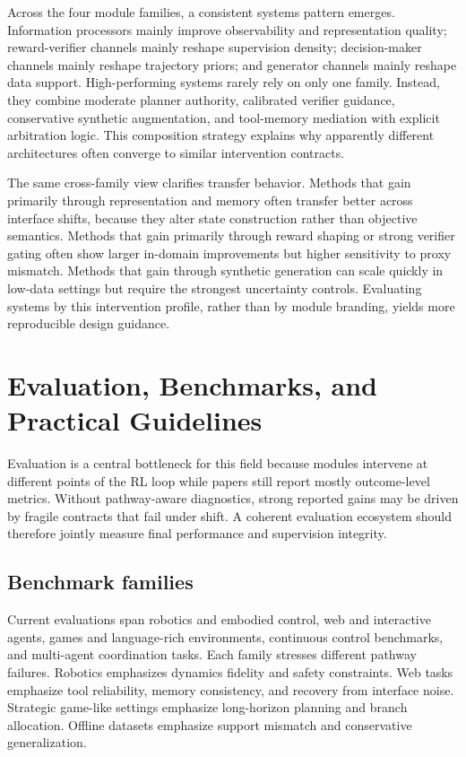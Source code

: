 ﻿\documentclass[conference]{IEEEtran}
\begin{document}
Across the four module families, a consistent systems pattern emerges. Information processors mainly improve observability and representation quality; reward-verifier channels mainly reshape supervision density; decision-maker channels mainly reshape trajectory priors; and generator channels mainly reshape data support. High-performing systems rarely rely on only one family. Instead, they combine moderate planner authority, calibrated verifier guidance, conservative synthetic augmentation, and tool-memory mediation with explicit arbitration logic. This composition strategy explains why apparently different architectures often converge to similar intervention contracts.

The same cross-family view clarifies transfer behavior. Methods that gain primarily through representation and memory often transfer better across interface shifts, because they alter state construction rather than objective semantics. Methods that gain primarily through reward shaping or strong verifier gating often show larger in-domain improvements but higher sensitivity to proxy mismatch. Methods that gain through synthetic generation can scale quickly in low-data settings but require the strongest uncertainty controls. Evaluating systems by this intervention profile, rather than by module branding, yields more reproducible design guidance.
\section{Evaluation, Benchmarks, and Practical Guidelines}
Evaluation is a central bottleneck for this field because modules intervene at different points of the RL loop while papers still report mostly outcome-level metrics. Without pathway-aware diagnostics, strong reported gains may be driven by fragile contracts that fail under shift. A coherent evaluation ecosystem should therefore jointly measure final performance and supervision integrity.

\subsection{Benchmark families}
Current evaluations span robotics and embodied control, web and interactive agents, games and language-rich environments, continuous control benchmarks, and multi-agent coordination tasks. Each family stresses different pathway failures. Robotics emphasizes dynamics fidelity and safety constraints. Web tasks emphasize tool reliability, memory consistency, and recovery from interface noise. Strategic game-like settings emphasize long-horizon planning and branch allocation. Offline datasets emphasize support mismatch and conservative generalization.
\end{document}
